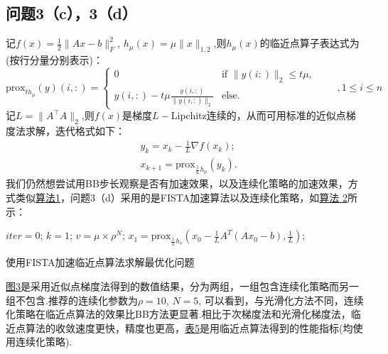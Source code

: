 \documentclass[10pt,a4paper]{article}
\begin{document}
\subsection{问题3（c），3（d）}
记$f(x)=\frac{1}{2}\|Ax-b\|_{F}^{2}$, $h_{\mu}(x)=\mu \|x\|_{1,2}$,则$h_{\mu}(x)$的临近点算子表达式为(按行分量分别表示)：
$$\text{prox}_{th_{\mu}}(y)(i,:)=\begin{cases}
	0&\text{if } \|y(i:)\|_{2}\leq t\mu,\\
	y(i,:)-t\mu\frac{y(i,:)}{\|y(i,:)\|_{2}} &\text{else.}
\end{cases}\qquad ,1\leq i\leq n
$$
记$L=\|A^{\top}A\|_{2}$,则$f(x)$是梯度$L-$Lipchitz连续的，从而可用标准的近似点梯度法求解，迭代格式如下：
$$\begin{aligned}
	&y_{k}=x_{k}-\frac{1}{L}\nabla f(x_{k});\\
	&x_{k+1}=\text{prox}_{\frac{1}{L}h_{\mu}}(y_{k}).
\end{aligned}$$
我们仍然想尝试用BB步长观察是否有加速效果，以及连续化策略的加速效果，方式类似\hyperref[alg 1]{算法1}，问题3（d）采用的是FISTA加速算法以及连续化策略，如\hyperref[alg 2]{算法 2}所示：\\
\begin{algorithm}[H]
	\SetAlgoLined
	$iter = 0$; %
	$k = 1$; %
	$v = \mu \times \rho^N$; %
	$x_1 = \text{prox}_{\frac{1}{L}h_{v}}\left(x_0 - \frac{1}{L} A^T (A x_0 - b), \frac{1}{L}\right)$; %
	
	\caption{使用FISTA加速临近点算法求解最优化问题}
	\label{alg 2}
\end{algorithm}
\hyperref[13]{图3}是采用近似点梯度法得到的数值结果，分为两组，一组包含连续化策略而另一组不包含.推荐的连续化参数为$\rho=10$, $N=5$, 可以看到，与光滑化方法不同，连续化策略在临近点算法的效果比BB方法更显著.相比于次梯度法和光滑化梯度法，临近点算法的收敛速度更快，精度也更高，\hyperref[14]{表5}是用临近点算法得到的性能指标(均使用连续化策略).
\end{document}
